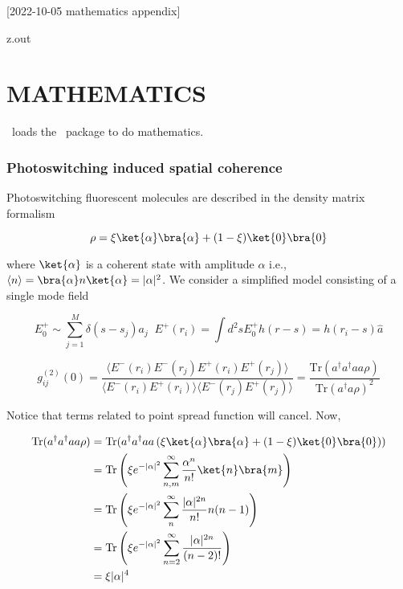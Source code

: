 [2022-10-05 mathematics appendix]

\begin{VerbatimOut}{z.out}
\chapter{MATHEMATICS}

\PurdueThesisLogo\ loads the \AMSmathLogo\ package
\cite{amslatex3project2019}
to do mathematics.
\end{VerbatimOut}


\subsection{Photoswitching induced spatial coherence}

Photoswitching fluorescent molecules are described in the density matrix formalism

\begin{equation*}
\rho = \xi\ket{\alpha}\bra{\alpha} + (1-\xi)\ket{0}\bra{0}
\end{equation*}

where $\ket{\alpha}$ is a coherent state with amplitude $\alpha$ i.e., $\langle n\rangle = \bra{\alpha} n\ket{\alpha} = |\alpha|^{2}$. We consider a simplified model consisting of a single mode field 

\begin{equation*}
E_{0}^{+}\sim \sum_{j=1}^{M}\delta(s-s_{j})a_{j} \;\; E^{+}(r_{i}) = \int d^{2}s E_{0}^{+} h(r-s) = h(r_{i}-s)\hat{a}
\end{equation*}

\begin{equation*}
g^{(2)}_{ij}(0) = \frac{\langle E^{-}(r_{i})E^{-}(r_{j})E^{+}(r_{i})E^{+}(r_{j}) \rangle}{\langle E^{-}(r_{i})E^{+}(r_{i})\rangle\langle E^{-}(r_{j})E^{+}(r_{j})\rangle} = \frac{\mathrm{Tr}(a^{\dagger}a^{\dagger}aa\rho)}{\mathrm{Tr}(a^{\dagger}a\rho)^{2}}
\end{equation*}

Notice that terms related to point spread function will cancel. Now,

\begin{align*}
\mathrm{Tr}(a^{\dagger}a^{\dagger}aa\rho) &= \mathrm{Tr}(a^{\dagger}a^{\dagger}aa \left(\xi\ket{\alpha}\bra{\alpha} + (1-\xi)\ket{0}\bra{0}\right))\\
&= \mathrm{Tr}\left(\xi e^{-|\alpha|^{2}}\sum_{n,m}^{\infty}\frac{\alpha^{n}}{n!}\ket{n}\bra{m}\right)\\
&= \mathrm{Tr}\left(\xi e^{-|\alpha|^{2}}\sum_{n}^{\infty}\frac{|\alpha|^{2n}}{n!}n(n-1)\right)\\
&= \mathrm{Tr}\left(\xi e^{-|\alpha|^{2}}\sum_{n=2}^{\infty}\frac{|\alpha|^{2n}}{(n-2)!}\right)\\
&= \xi|\alpha|^{4}
\end{align*}

